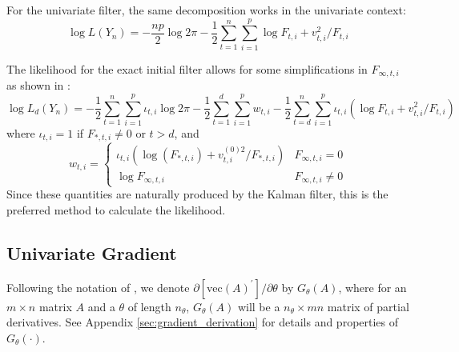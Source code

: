 \documentclass[12pt]{article}
\newcommand{\Gt}{G_\theta}
\newcommand{\vecop}[0]{\text{vec}}
\begin{document}
	For the univariate filter, the same decomposition works in the univariate context:
	\begin{equation} \label{eq:likelihood_uni}
	\log L(Y_n) = -\frac{np}{2} \log 2\pi - \frac{1}{2} \sum_{t=1}^n \sum_{i=1}^p\log F_{t,i}+ v_{t,i}^2 / F_{t,i} 
	\end{equation}
	
	The likelihood for the exact initial filter allows for some simplifications in $F_{\infty,t,i}$ as shown in \cite{dk_book}:
	\begin{equation} \label{eq:likelihood_uni_diff}
	\log L_d(Y_n) = -\frac{1}{2} \sum_{t=1}^n \sum_{i=1}^p \iota_{t,i} \log 2\pi  - \frac{1}{2}  \sum_{t=1}^d \sum_{i=1}^p w_{t,i} - \frac{1}{2} \sum_{t=d}^n \sum_{i=1}^p \iota_{t,i} \left(\log F_{t,i}+ v_{t,i}^2 / F_{t,i} \right)
	\end{equation}
	where  $\iota_{t,i} = 1$ if $F_{*,t,i} \neq 0$ or $ t > d$, and 
	\begin{equation*}
	w_{t,i} = \begin{cases} 
	   \iota_{t,i} (\log (F_{*,t,i}) + v_{t,i}^{(0)2} / F_{*,t,i}) & F_{\infty,t,i} = 0 \\
	   \log F_{\infty,t,i} & F_{\infty,t,i} \neq 0
	\end{cases} 
	\end{equation*}
	Since these quantities are naturally produced by the Kalman filter, this is the preferred method to calculate the likelihood.

\subsection*{Univariate Gradient}
	Following the notation of \cite{nagakura}, we denote $\partial \left[ \vecop(A)^\prime \right] / \partial \theta$ by $\Gt(A)$, where for an $m \times n$ matrix $A$ and a $\theta$ of length $n_\theta$, $\Gt(A)$ will be a $n_\theta \times mn$ matrix of partial derivatives. See Appendix \ref{sec:gradient_derivation} for details and properties of $\Gt(\cdot)$. \\
\end{document}
